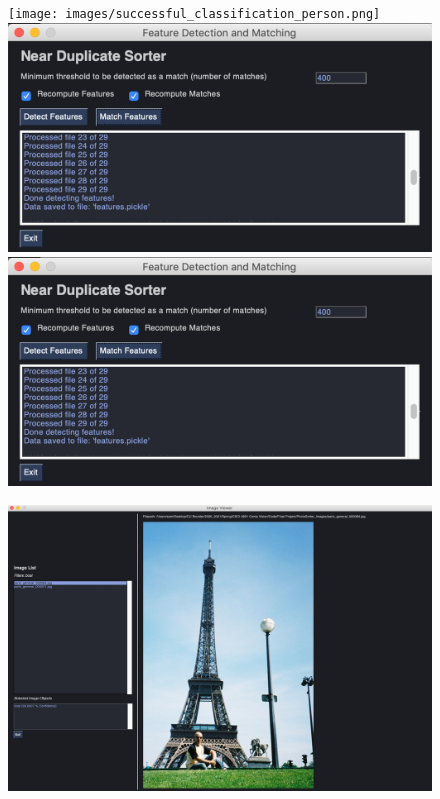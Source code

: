 \documentclass[12pt]{article}
\begin{document}
	\begin{figure}
		\texttt{[image: images/successful\_classification\_person.png]}
		\includegraphics[scale=0.3]{images/near_duplicate_GUI1.png}
		\includegraphics[scale=0.3]{images/near_duplicate_GUI1.png}
	\end{figure}
	
	
	\begin{figure}
	\includegraphics[scale=0.3]{images/incorrect_classification_boat.png}
	\end{figure}
\end{document}
